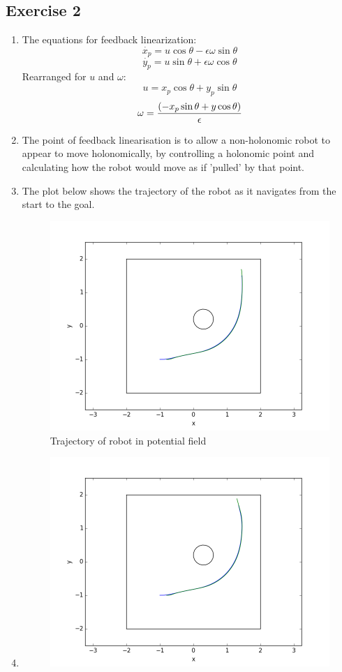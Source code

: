 \documentclass[12pt,a4paper]{article}
\begin{document}
\subsection*{Exercise 2}
\begin{enumerate}[label=(\alph*)]
	\item The equations for feedback linearization:
		$$\dot{x_p} = u\cos{\theta} - \epsilon \omega \sin{\theta}$$
		$$\dot{y_p} = u\sin{\theta} + \epsilon \omega \cos{\theta}$$
		Rearranged for $u$ and $\omega$:
		$$ u =x_p\cos{\theta} + y_p\sin{\theta} $$
		$$ \omega = {(-x_p\sin{\theta}+y\cos{\theta})\over{\epsilon}}$$
	\item The point of feedback linearisation is to allow a non-holonomic robot to appear to move holonomically, by controlling a holonomic point and calculating how the robot would move as if 'pulled' by that point.
	\item The plot below shows the trajectory of the robot as it navigates from the start to the goal.
	\begin{figure}[!h]
		\centering
		\includegraphics[width=\textwidth]{fig/2c.png}
		\caption{Trajectory of robot in potential field}
		\label{fig:trajectory}
	\end{figure}
	\item 
	\begin{figure}[!h]
		\centering
		\includegraphics[width=\textwidth]{fig/2d.png}

\end{figure}
\end{enumerate}
\end{document}

